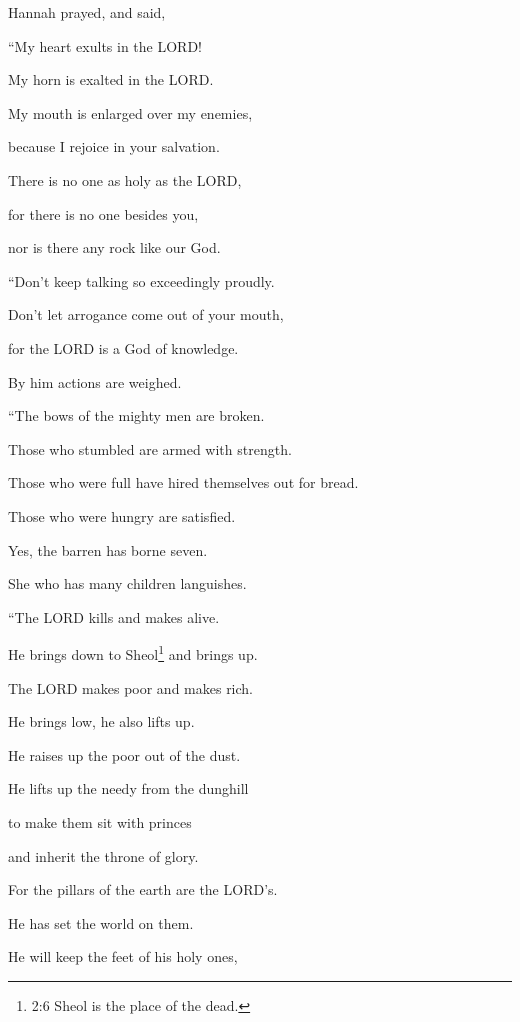\mychapter{} \myverse*{}Hannah prayed, and said,

“My heart exults in the LORD!

My horn is exalted in the LORD.

My mouth is enlarged over my enemies,

because I rejoice in your salvation.

\myverse{}There is no one as holy as the LORD,

for there is no one besides you,

nor is there any rock like our God.


\vspace{\baselineskip} \myverse{}“Don’t keep talking so exceedingly proudly.

Don’t let arrogance come out of your mouth,

for the LORD is a God of knowledge.

By him actions are weighed.


\vspace{\baselineskip} \myverse{}“The bows of the mighty men are broken.

Those who stumbled are armed with strength.

\myverse{}Those who were full have hired themselves out for bread.

Those who were hungry are satisfied.

Yes, the barren has borne seven.

She who has many children languishes.


\vspace{\baselineskip} \myverse{}“The LORD kills and makes alive.

He brings down to Sheol\footnote{2:6 Sheol is the place of the dead.} and brings up.

\myverse{}The LORD makes poor and makes rich.

He brings low, he also lifts up.

\myverse{}He raises up the poor out of the dust.

He lifts up the needy from the dunghill

to make them sit with princes

and inherit the throne of glory.

For the pillars of the earth are the LORD’s.

He has set the world on them.

\myverse{}He will keep the feet of his holy ones,

